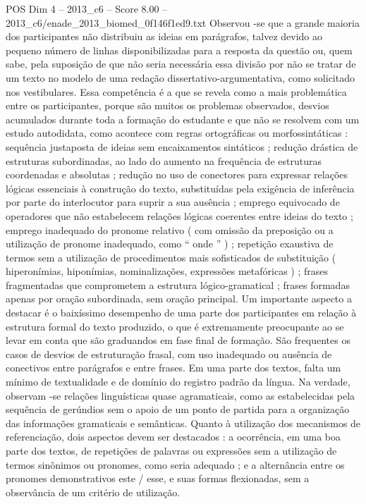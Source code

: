 \begin{textsample}{POS Dim 4 – 2013\_c6 – Score 8.00 – 2013\_c6/enade\_2013\_biomed\_0f146f1ed9.txt}
Observou -se que a grande maioria dos participantes não distribuiu as ideias em parágrafos, talvez devido ao pequeno número de linhas disponibilizadas para a resposta da questão ou, quem sabe, pela suposição de que não seria necessária essa divisão por não se tratar de um texto no modelo de uma redação dissertativo-argumentativa, como solicitado nos vestibulares.
Essa competência é a que se revela como a mais problemática entre os participantes, porque são muitos os problemas observados, desvios acumulados durante toda a formação do estudante e que não se resolvem com um estudo autodidata, como acontece com regras ortográficas ou morfossintáticas : sequência justaposta de ideias sem encaixamentos sintáticos ; redução drástica de estruturas subordinadas, ao lado do aumento na frequência de estruturas coordenadas e absolutas ; redução no uso de conectores para expressar relações lógicas essenciais à construção do texto, substituídas pela exigência de inferência por parte do interlocutor para suprir a sua ausência ; emprego equivocado de operadores que não estabelecem relações lógicas coerentes entre ideias do texto ; emprego inadequado do pronome relativo ( com omissão da preposição ou a utilização de pronome inadequado, como “ onde ” ) ; repetição exaustiva de termos sem a utilização de procedimentos mais sofisticados de substituição ( hiperonímias, hiponímias, nominalizações, expressões metafóricas ) ; frases fragmentadas que comprometem a estrutura lógico-gramatical ; frases formadas apenas por oração subordinada, sem oração principal.
Um importante aspecto a destacar é o baixíssimo desempenho de uma parte dos participantes em relação à estrutura formal do texto produzido, o que é extremamente preocupante ao se levar em conta que são graduandos em fase final de formação.
São frequentes os casos de desvios de estruturação frasal, com uso inadequado ou ausência de conectivos entre parágrafos e entre frases.
Em uma parte dos textos, falta um mínimo de textualidade e de domínio do registro padrão da língua.
Na verdade, observam -se relações linguísticas quase agramaticais, como as estabelecidas pela sequência de gerúndios sem o apoio de um ponto de partida para a organização das informações gramaticais e semânticas.
Quanto à utilização dos mecanismos de referenciação, dois aspectos devem ser destacados : a ocorrência, em uma boa parte dos textos, de repetições de palavras ou expressões sem a utilização de termos sinônimos ou pronomes, como seria adequado ; e a alternância entre os pronomes demonstrativos este / esse, e suas formas flexionadas, sem a observância de um critério de utilização.

\end{textsample}
